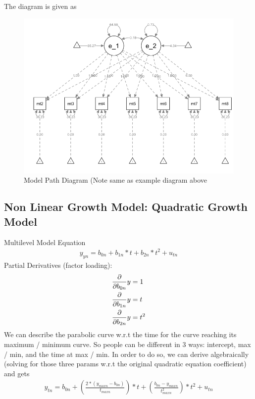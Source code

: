 The diagram is given as 
\begin{figure}[ht]
    \centering
    \includegraphics{images/006_linear_growth_model_path.png}
    \caption{Model Path Diagram (Note same as example diagram above}
    \label{fig:linear_growth_mod_path}
\end{figure}



\subsection{Non Linear Growth Model: Quadratic Growth Model} 
Multilevel Model Equation 
    \begin{align*}
        y_{yn} = b_{0n} + b_{1n} * t + b_{2n} * t^2 + u_{tn}
    \end{align*}
Partial Derivatives (factor loading): 
    \begin{align*}
        & \frac{\partial}{\partial b_{0n}} y = 1 \\
        & \frac{\partial}{\partial b_{1n}} y = t \\
        & \frac{\partial}{\partial b_{2n}} y = t^2
    \end{align*}
We can describe the parabolic curve w.r.t the time for the curve reaching its maximum / minimum curve. So people can be different in 3 ways: intercept, max / min, and the time at max / min. In order to do so, we can derive algebraically (solving for those three params w.r.t the original quadratic equation coefficient) and gets 
    \begin{align*}
    y_{tn} = b_{0n} + \left(\frac{2 * (y_{maxn} - b_{0n})}{t_{maxn}} \right) * t + \left( \frac{b_{0n}-y_{maxn}}{t^2_{maxn}} \right)*t^2 + u_{tn}
    \end{align*}

